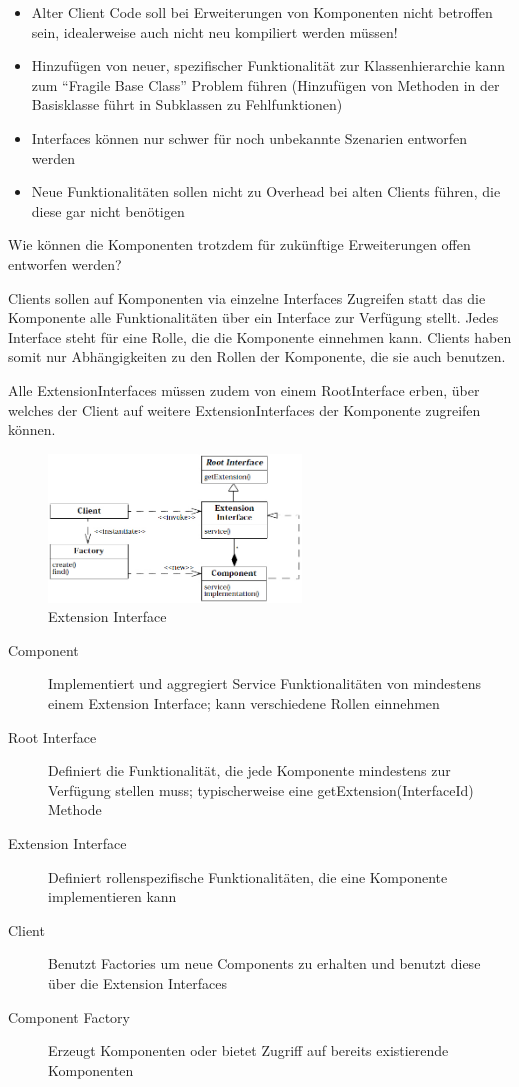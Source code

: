 \begin{itemize}
	\item Alter Client Code soll bei Erweiterungen von Komponenten nicht betroffen sein, idealerweise auch nicht neu kompiliert werden müssen!
	\item Hinzufügen von neuer, spezifischer Funktionalität zur Klassenhierarchie kann zum ``Fragile Base Class'' Problem führen (Hinzufügen von Methoden in der Basisklasse führt in Subklassen zu Fehlfunktionen)
	\item Interfaces können nur schwer für noch unbekannte Szenarien entworfen werden
	\item Neue Funktionalitäten sollen nicht zu Overhead bei alten Clients führen, die diese gar nicht benötigen
\end{itemize}

Wie können die Komponenten trotzdem für zukünftige Erweiterungen offen entworfen werden?

Clients sollen auf Komponenten via einzelne Interfaces Zugreifen statt das die Komponente alle Funktionalitäten über ein Interface zur Verfügung stellt. Jedes Interface steht für eine Rolle, die die Komponente einnehmen kann. Clients haben somit nur Abhängigkeiten zu den Rollen der Komponente, die sie auch benutzen.

Alle ExtensionInterfaces müssen zudem von einem RootInterface erben, über welches der Client auf weitere ExtensionInterfaces der Komponente zugreifen können.

\begin{figure}[H]
	\centering
	\includegraphics[width=0.6\textwidth]{content/advancedPatterns/extensioninterface.jpg}
	\caption{Extension Interface}
\end{figure}

\begin{description}
	\item[Component] Implementiert und aggregiert Service Funktionalitäten von mindestens einem Extension Interface; kann verschiedene Rollen einnehmen
	\item[Root Interface] Definiert die Funktionalität, die jede Komponente mindestens zur Verfügung stellen muss; typischerweise eine getExtension(InterfaceId) Methode
	\item[Extension Interface] Definiert rollenspezifische Funktionalitäten, die eine Komponente implementieren kann
	\item[Client] Benutzt Factories um neue Components zu erhalten und benutzt diese über die Extension Interfaces
	\item[Component Factory] Erzeugt Komponenten oder bietet Zugriff auf bereits existierende Komponenten
\end{description}

